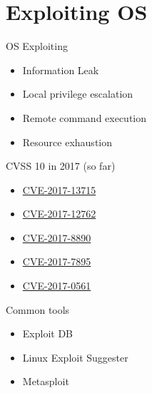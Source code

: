 \documentclass{curs}
\begin{document}
\section{Exploiting OS}

\begin{frame}{OS Exploiting}
  \begin{itemize}
    \item Information Leak
    \item Local privilege escalation
    \item Remote command execution
    \item Resource exhaustion
  \end{itemize}
\end{frame}

\begin{frame}{CVSS 10 in 2017 (so far)}
  \begin{itemize}
    \item \href{http://www.cvedetails.com/cve/CVE-2017-13715/}{CVE-2017-13715}
    \item \href{http://www.cvedetails.com/cve/CVE-2017-12762/}{CVE-2017-12762}
    \item \href{http://www.cvedetails.com/cve/CVE-2017-8890/}{CVE-2017-8890}
    \item \href{http://www.cvedetails.com/cve/CVE-2017-7895/}{CVE-2017-7895}
    \item \href{http://www.cvedetails.com/cve/CVE-2017-0561/}{CVE-2017-0561}
  \end{itemize}
\end{frame}

\begin{frame}{Common tools}
  \begin{itemize}
    \item Exploit DB
    \item Linux Exploit Suggester
    \item Metasploit
  \end{itemize}
\end{frame}
\end{document}
